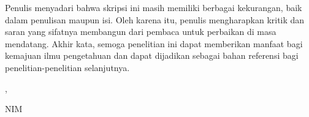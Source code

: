 Penulis menyadari bahwa skripsi ini masih memiliki berbagai kekurangan, baik dalam penulisan maupun isi. Oleh karena itu, penulis mengharapkan kritik dan saran yang sifatnya membangun dari pembaca untuk perbaikan di masa mendatang.
Akhir kata, semoga penelitian ini dapat memberikan manfaat bagi kemajuan ilmu pengetahuan dan dapat dijadikan sebagai bahan referensi bagi penelitian-penelitian selanjutnya.

\vspace{1cm}
\begin{flushright}
\city{}, \examinationDate{}

\vspace{2cm}


\noindent\authorName{}

\noindent NIM \studentID{}
\end{flushright}

\newpage

%
%
%
%
%
